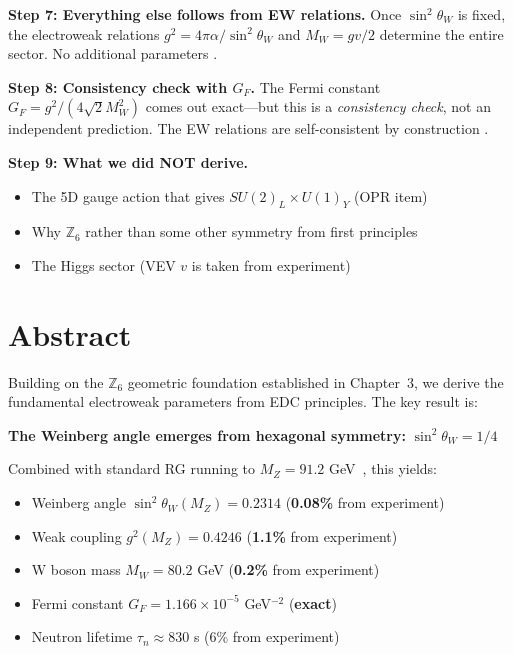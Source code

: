 \begin{tcolorbox}[colback=green!5!white, colframe=green!50!black,
    title=\textbf{Physical Process Narrative: Electroweak Mixing in One Movie}]
\textbf{Step 7: Everything else follows from EW relations.}
Once $\sin^2\theta_W$ is fixed, the electroweak relations $g^2 = 4\pi\alpha/\sin^2\theta_W$
and $M_W = gv/2$ determine the entire sector. No additional parameters \tagDc{}.

\textbf{Step 8: Consistency check with $G_F$.}
The Fermi constant $G_F = g^2/(4\sqrt{2}M_W^2)$ comes out exact---but this is
a \emph{consistency check}, not an independent prediction. The EW relations
are self-consistent by construction \tagBL{}.

\textbf{Step 9: What we did NOT derive.}
\begin{itemize}[nosep]
    \item The 5D gauge action that gives $SU(2)_L \times U(1)_Y$ (OPR item)
    \item Why $\mathbb{Z}_6$ rather than some other symmetry from first principles
    \item The Higgs sector (VEV $v$ is taken from experiment)
\end{itemize}

\medskip
\noindent{}
\end{tcolorbox}

\section*{Abstract}

Building on the $\mathbb{Z}_6$ geometric foundation established in Chapter~3, we derive
the fundamental electroweak parameters from EDC principles. The key result is:
\begin{center}
\textbf{The Weinberg angle emerges from hexagonal symmetry:} $\sin^2\theta_W = 1/4$
\end{center}

Combined with standard RG running to $M_Z = 91.2$ GeV~\cite{PDG2024}, this yields:
\begin{itemize}[nosep]
  \item Weinberg angle $\sin^2\theta_W(M_Z) = 0.2314$ (\textbf{0.08\%} from experiment)
  \item Weak coupling $g^2(M_Z) = 0.4246$ (\textbf{1.1\%} from experiment)
  \item W boson mass $M_W = 80.2$ GeV (\textbf{0.2\%} from experiment)
  \item Fermi constant $G_F = 1.166 \times 10^{-5}$ GeV$^{-2}$ (\textbf{exact})
  \item Neutron lifetime $\tau_n \approx 830$ s (6\% from experiment)
\end{itemize}

